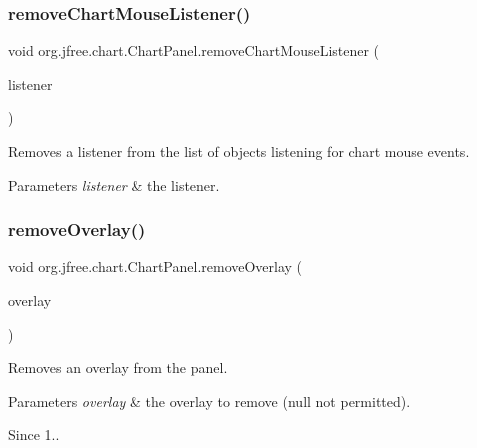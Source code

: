 \subsubsection{\texorpdfstring{remove\+Chart\+Mouse\+Listener()}{removeChartMouseListener()}}
{\footnotesize\ttfamily void org.\+jfree.\+chart.\+Chart\+Panel.\+remove\+Chart\+Mouse\+Listener (\begin{DoxyParamCaption}\item[{\mbox{\hyperlink{interfaceorg_1_1jfree_1_1chart_1_1_chart_mouse_listener}{Chart\+Mouse\+Listener}}}]{listener }\end{DoxyParamCaption})}

Removes a listener from the list of objects listening for chart mouse events.


\begin{DoxyParams}{Parameters}
{\em listener} & the listener. \\
\hline
\end{DoxyParams}
\mbox{\label{classorg_1_1jfree_1_1chart_1_1_chart_panel_aaaafd8f993cc3387efee45b893b88086}} 
\subsubsection{\texorpdfstring{remove\+Overlay()}{removeOverlay()}}
{\footnotesize\ttfamily void org.\+jfree.\+chart.\+Chart\+Panel.\+remove\+Overlay (\begin{DoxyParamCaption}\item[{\mbox{\hyperlink{interfaceorg_1_1jfree_1_1chart_1_1panel_1_1_overlay}{Overlay}}}]{overlay }\end{DoxyParamCaption})}

Removes an overlay from the panel.


\begin{DoxyParams}{Parameters}
{\em overlay} & the overlay to remove ({\ttfamily null} not permitted).\\
\hline
\end{DoxyParams}
\begin{DoxySince}{Since}
1.. 
\end{DoxySince}
\mbox{\label{classorg_1_1jfree_1_1chart_1_1_chart_panel_ab40f9738c59285af1ba12b3b5ffbf013}} 
